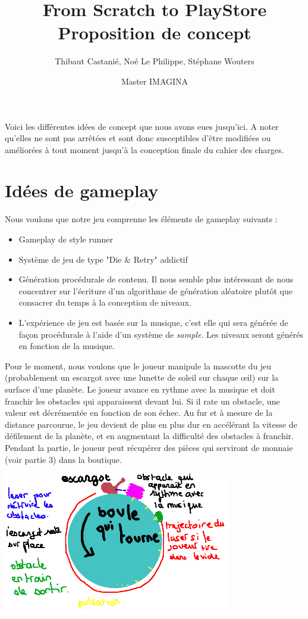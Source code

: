 \documentclass[a4paper,11pt]{article}
\begin{document}
\title{\textbf{From Scratch to PlayStore}\\Proposition de concept}
\author{Thibaut Castanié, Noé Le Philippe, Stéphane Wouters}
\date{Master IMAGINA}
\pagestyle{empty}
\maketitle
\thispagestyle{empty}
\pagebreak 
Voici les différentes idées de concept que nous avons eues jusqu’ici. A noter qu’elles ne sont pas arrêtées et sont donc susceptibles d’être modifiées ou améliorées à tout moment jusqu'à la conception finale du cahier des charges.
\section{Idées de gameplay}
Nous voulons que notre jeu comprenne les éléments de gameplay suivants :
\begin{itemize}
\item{Gameplay de style runner}
\item{Système de jeu de type "Die \& Retry" addictif}
\item{Génération procédurale de contenu. Il nous semble plus intéressant de nous concentrer sur l’écriture d’un algorithme de génération aléatoire plutôt que consacrer du temps à la conception de niveaux.}
\item{L'expérience de jeu est basée sur la musique, c’est elle qui sera générée de façon procédurale à l’aide d’un système de \textsl{sample}. Les niveaux seront générés en fonction de la musique.
}
\end{itemize}
Pour le moment, nous voulons que le joueur manipule la mascotte du jeu (probablement un escargot avec une lunette de soleil sur chaque œil) sur la surface d’une planète. Le joueur avance en rythme avec la musique et doit franchir les obstacles qui apparaissent devant lui. Si il rate un obstacle, une valeur est décrémentée en fonction de son échec. Au fur et à mesure de la distance parcourue, le jeu devient de plus en plus dur en accélérant la vitesse de défilement de la planète, et en augmentant la difficulté des obstacles à franchir. Pendant la partie, le joueur peut récupérer des pièces qui serviront de monnaie (voir partie 3) dans la boutique.
\linebreak 
\begin{center}
\includegraphics[width=10cm]{ter.png} 
\end{center}
\end{document}
